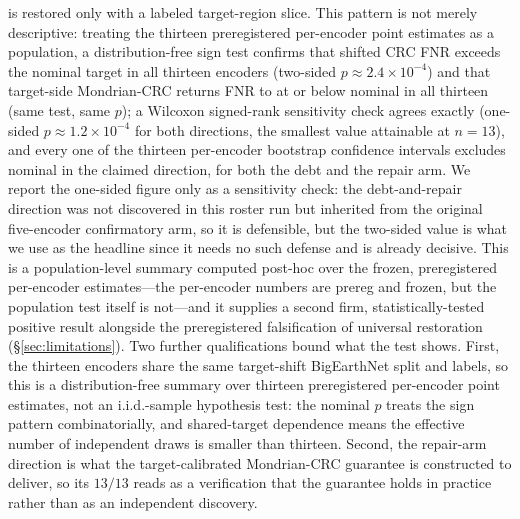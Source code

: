 \documentclass[preprint,11pt,authoryear]{elsarticle}
\begin{document}
is restored only with a labeled target-region slice.
This pattern is not merely descriptive: treating the thirteen preregistered per-encoder point estimates
as a population, a distribution-free sign test confirms that shifted CRC FNR exceeds the nominal target
in all thirteen encoders (two-sided $p\approx2.4\times10^{-4}$) and that target-side Mondrian-CRC returns
FNR to at or below nominal in all thirteen (same test, same $p$); a Wilcoxon signed-rank sensitivity
check agrees exactly (one-sided $p\approx1.2\times10^{-4}$ for both directions, the smallest value
attainable at $n{=}13$), and every one of the thirteen per-encoder bootstrap confidence intervals
excludes nominal in the claimed direction, for both the debt and the repair arm. We report the
one-sided figure only as a sensitivity check: the debt-and-repair direction was not discovered in this
roster run but inherited from the original five-encoder confirmatory arm, so it is defensible, but the
two-sided value is what we use as the headline since it needs no such defense and is already decisive.
This is a population-level summary computed post-hoc over the frozen, preregistered per-encoder
estimates---the per-encoder numbers are prereg and frozen, but the population test itself is not---and
it supplies a second firm, statistically-tested positive result alongside the preregistered
falsification of universal restoration (\S\ref{sec:limitations}). Two further qualifications bound what the test shows.
First, the thirteen encoders share the same target-shift BigEarthNet split and labels, so this
is a distribution-free summary over thirteen preregistered per-encoder point estimates, not an
i.i.d.-sample hypothesis test: the nominal $p$ treats the sign pattern combinatorially, and
shared-target dependence means the effective number of independent draws is smaller than
thirteen. Second, the repair-arm direction is what the target-calibrated Mondrian-CRC
guarantee is constructed to deliver, so its $13/13$ reads as a verification that the guarantee
holds in practice rather than as an independent discovery.
\end{document}
